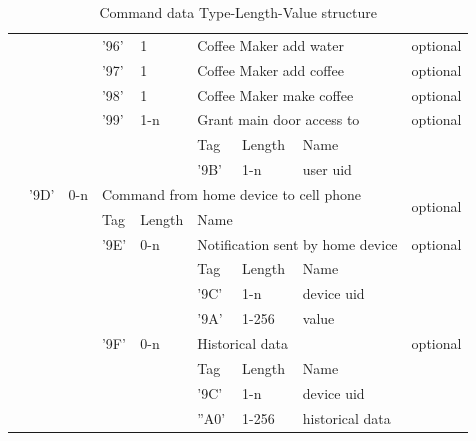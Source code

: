 \begin{table}[!htb]
{\begin{tabular}{|l|l|l|l|l|l|l|l|l|l|}
\multicolumn{2}{|l|}{} & \multicolumn{2}{l|}{} & '96' & 1 & \multicolumn{3}{l|}{Coffee Maker add water} & optional \\ \cline{5-10} 
\multicolumn{2}{|l|}{} & \multicolumn{2}{l|}{} & '97' & 1 & \multicolumn{3}{l|}{Coffee Maker add coffee} & optional \\ \cline{5-10} 
\multicolumn{2}{|l|}{} & \multicolumn{2}{l|}{} & '98' & 1 & \multicolumn{3}{l|}{Coffee Maker make coffee} & optional \\ \cline{5-10} 
\multicolumn{2}{|l|}{} & \multicolumn{2}{l|}{} & '99' & 1-n & \multicolumn{3}{l|}{Grant main door access to} & optional \\ \cline{5-10} 
\multicolumn{2}{|l|}{} & \multicolumn{2}{l|}{} & \multicolumn{2}{l|}{\multirow{2}{*}{}} & Tag & Length & Name & \multirow{2}{*}{} \\ \cline{7-9}
\multicolumn{2}{|l|}{} & \multicolumn{2}{l|}{} & \multicolumn{2}{l|}{} & '9B' & 1-n & user uid &  \\ \cline{3-10} 
\multicolumn{2}{|l|}{} & '9D' & 0-n & \multicolumn{5}{l|}{Command from home device to cell phone} & \multirow{2}{*}{optional} \\ \cline{3-9}
\multicolumn{2}{|l|}{} & \multicolumn{2}{l|}{\multirow{9}{*}{}} & Tag & Length & \multicolumn{3}{l|}{Name} &  \\ \cline{5-10} 
\multicolumn{2}{|l|}{} & \multicolumn{2}{l|}{} & '9E' & 0-n & \multicolumn{3}{l|}{Notification sent by home device} & optional \\ \cline{5-10} 
\multicolumn{2}{|l|}{} & \multicolumn{2}{l|}{} & \multicolumn{2}{l|}{\multirow{3}{*}{}} & Tag & Length & Name & \multirow{3}{*}{} \\ \cline{7-9}
\multicolumn{2}{|l|}{} & \multicolumn{2}{l|}{} & \multicolumn{2}{l|}{} & '9C' & 1-n & device uid &  \\ \cline{7-9}
\multicolumn{2}{|l|}{} & \multicolumn{2}{l|}{} & \multicolumn{2}{l|}{} & '9A' & 1-256 & value &  \\ \cline{5-10} 
\multicolumn{2}{|l|}{} & \multicolumn{2}{l|}{} & '9F' & 0-n & \multicolumn{3}{l|}{Historical data} & optional \\ \cline{5-10} 
\multicolumn{2}{|l|}{} & \multicolumn{2}{l|}{} & \multicolumn{2}{l|}{\multirow{3}{*}{}} & Tag & Length & Name & \multirow{3}{*}{} \\ \cline{7-9}
\multicolumn{2}{|l|}{} & \multicolumn{2}{l|}{} & \multicolumn{2}{l|}{} & '9C' & 1-n & device uid &  \\ \cline{7-9}
\multicolumn{2}{|l|}{} & \multicolumn{2}{l|}{} & \multicolumn{2}{l|}{} & ''A0' & 1-256 & historical data &  \\ \hline
\end{tabular}
}
\caption{Command data Type-Length-Value structure}
\label{tlv}
\end{table}

